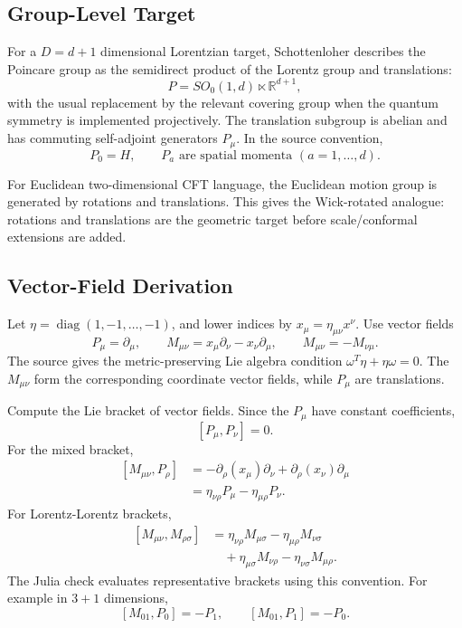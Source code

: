 \subsection{Group-Level Target}

For a \(D=d+1\) dimensional Lorentzian target, Schottenloher describes the
Poincare group as the semidirect product of the Lorentz group and translations:
\[
  P = SO_0(1,d)\ltimes \mathbb R^{d+1},
\]
with the usual replacement by the relevant covering group when the quantum
symmetry is implemented projectively.  The translation subgroup is abelian and
has commuting self-adjoint generators \(P_\mu\).  In the source convention,
\[
  P_0=H,\qquad P_a\text{ are spatial momenta }(a=1,\ldots,d).
\]

For Euclidean two-dimensional CFT language, the Euclidean motion group is
generated by rotations and translations.  This gives the Wick-rotated analogue:
rotations and translations are the geometric target before scale/conformal
extensions are added.

\subsection{Vector-Field Derivation}

Let \(\eta=\operatorname{diag}(1,-1,\ldots,-1)\), and lower indices by
\(x_\mu=\eta_{\mu\nu}x^\nu\).  Use vector fields
\[
  P_\mu=\partial_\mu,\qquad
  M_{\mu\nu}=x_\mu\partial_\nu-x_\nu\partial_\mu,\qquad M_{\mu\nu}=-M_{\nu\mu}.
\]
The source gives the metric-preserving Lie algebra condition
\(\omega^T\eta+\eta\omega=0\).  The \(M_{\mu\nu}\) form the corresponding
coordinate vector fields, while \(P_\mu\) are translations.

Compute the Lie bracket of vector fields.  Since the \(P_\mu\) have constant
coefficients,
\[
  [P_\mu,P_\nu]=0.
\]
For the mixed bracket,
\[
\begin{aligned}
  [M_{\mu\nu},P_\rho]
  &= -\partial_\rho(x_\mu)\partial_\nu
     +\partial_\rho(x_\nu)\partial_\mu\\
  &= \eta_{\nu\rho}P_\mu-\eta_{\mu\rho}P_\nu.
\end{aligned}
\]
For Lorentz-Lorentz brackets,
\[
\begin{aligned}
  [M_{\mu\nu},M_{\rho\sigma}]
  &=
    \eta_{\nu\rho}M_{\mu\sigma}
    -\eta_{\mu\rho}M_{\nu\sigma}\\
  &\quad
    +\eta_{\mu\sigma}M_{\nu\rho}
    -\eta_{\nu\sigma}M_{\mu\rho}.
\end{aligned}
\]
The Julia check evaluates representative brackets using this convention.  For
example in \(3+1\) dimensions,
\[
  [M_{01},P_0]=-P_1,\qquad [M_{01},P_1]=-P_0.
\]

